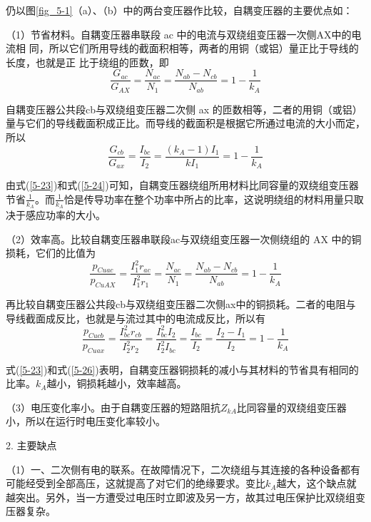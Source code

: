 \documentclass{book}
\begin{document}
仍以图\ref{fig_5-1}（a）、（b）中的两台变压器作比较，自耦变压器的主要优点如：

（1）节省材料。自耦变压器串联段 ac 中的电流与双绕组变压器一次侧AX中的电流相 同，所以它们所用导线的截面积相等，两者的用铜（或铝）量正比于导线的长度，也就是正 比于绕组的匝数，即
\begin{equation}
\frac{{{G}_{ac}}}{{{G}_{AX}}}=\frac{{{N}_{ac}}}{{{N}_{1}}}=\frac{{{N}_{ab}}-{{N}_{cb}}}{{{N}_{ab}}}=1-\frac{1}{{{k}_{A}}}
\label{5-23}
\end{equation}

自耦变压器公共段cb与双绕组变压器二次侧 ax 的匝数相等，二者的用铜（或铝）量与它们的导线截面积成正比。而导线的截面积是根据它所通过电流的大小而定，所以
\begin{equation}
\frac{{{G}_{cb}}}{{{G}_{ax}}}=\frac{{{I}_{bc}}}{{{I}_{2}}}=\frac{\left( {{k}_{A}}-1 \right){{I}_{1}}}{k{{I}_{1}}}=1-\frac{1}{{{k}_{A}}}
\label{5-24}
\end{equation}


由式(\ref{5-23})和式(\ref{5-24})可知，自耦变压器绕组所用材料比同容量的双绕组变压器节省$\frac{1}{{{k}_{A}}}$。而$\frac{1}{{{k}_{A}}}$恰是传导功率在整个功率中所占的比率，这说明绕组的材料用量只取决于感应功率的大小。

（2）效率高。比较自耦变压器串联段ac与双绕组变压器一次侧绕组的 AX 中的铜损耗，它们的比值为
\begin{equation}
\frac{{{p}_{Cuac}}}{{{p}_{CuAX}}}=\frac{I_{1}^{2}{{r}_{ac}}}{I_{1}^{2}{{r}_{1}}}=\frac{{{N}_{ac}}}{{{N}_{1}}}=\frac{{{N}_{ab}}-{{N}_{cb}}}{{{N}_{ab}}}=1-\frac{1}{{{k}_{A}}}
\label{5-25}
\end{equation}

再比较自耦变压器公共段cb与双绕组变压器二次侧ax中的铜损耗。二者的电阻与导线截面成反比，也就是与流过其中的电流成反比，所以有
\begin{equation}
\frac{{{p}_{Cucb}}}{{{p}_{Cuax}}}=\frac{I_{bc}^{2}{{r}_{cb}}}{I_{2}^{2}{{r}_{2}}}=\frac{I_{bc}^{2}{{I}_{2}}}{I_{2}^{2}{{I}_{bc}}}=\frac{{{I}_{bc}}}{{{I}_{2}}}=\frac{{{I}_{2}}-{{I}_{1}}}{{{I}_{2}}}=1-\frac{1}{{{k}_{A}}}
\label{5-26}
\end{equation}

式(\ref{5-23})和式(\ref{5-26})表明，自耦变压器铜损耗的减小与其材料的节省具有相同的比率。${{k}_{A}}$越小，铜损耗越小，效率越高。

（3）电压变化率小。由于自耦变压器的短路阻抗${{Z}_{kA}}$比同容量的双绕组变压器小，所以在运行时电压变化率较小。

2. 主要缺点

（1）一、二次侧有电的联系。在故障情况下，二次绕组与其连接的各种设备都有可能经受到全部高压，这就提高了对它们的绝缘要求。变比${{k}_{A}}$越大，这个缺点就越突出。另外，当一方遭受过电压时立即波及另一方，故其过电压保护比双绕组变压器复杂。
\end{document}

